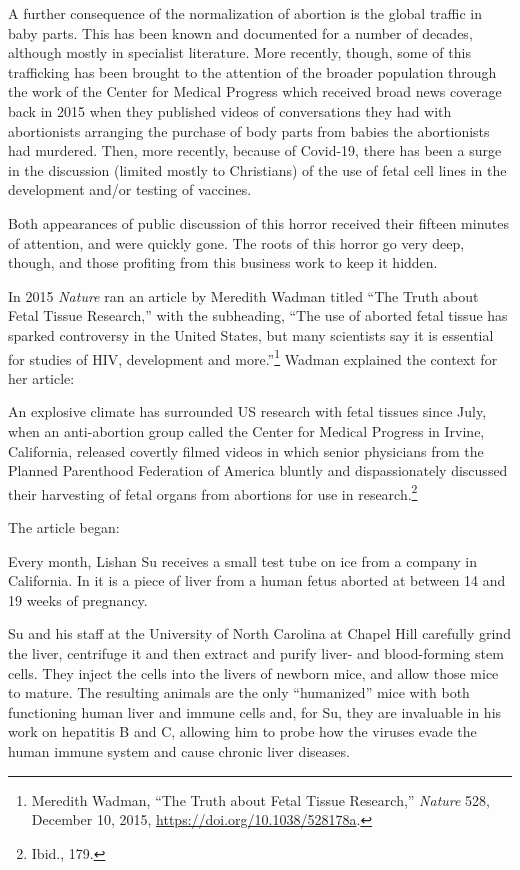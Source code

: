 \documentclass[
]{book}
\begin{document}
A further consequence of the normalization of abortion is the global traffic in baby parts. This has been known and documented for a number of decades, although mostly in specialist literature. More recently, though, some of this trafficking has been brought to the attention of the broader population through the work of the Center for Medical Progress which received broad news coverage back in 2015 when they published videos of conversations they had with abortionists arranging the purchase of body parts from babies the abortionists had murdered. Then, more recently, because of Covid-19, there has been a surge in the discussion (limited mostly to Christians) of the use of fetal cell lines in the development and/or testing of vaccines.

Both appearances of public discussion of this horror received their fifteen minutes of attention, and were quickly gone. The roots of this horror go very deep, though, and those profiting from this business work to keep it hidden.

In 2015 \emph{Nature} ran an article by Meredith Wadman titled ``The Truth about Fetal Tissue Research,'' with the subheading, ``The use of aborted fetal tissue has sparked controversy in the United States, but many scientists say it is essential for studies of HIV, development and more.''\footnote{Meredith Wadman, ``The Truth about Fetal Tissue Research,'' \emph{Nature} 528, December 10, 2015, \url{https://doi.org/10.1038/528178a}.} Wadman explained the context for her article:

An explosive climate has surrounded US research with fetal tissues since July, when an anti-abortion group called the Center for Medical Progress in Irvine, California, released covertly filmed videos in which senior physicians from the Planned Parenthood Federation of America bluntly and dispassionately discussed their harvesting of fetal organs from abortions for use in research.\footnote{Ibid., 179.}

The article began:

Every month, Lishan Su receives a small test tube on ice from a company in California. In it is a piece of liver from a human fetus aborted at between 14 and 19 weeks of pregnancy.

Su and his staff at the University of North Carolina at Chapel Hill carefully grind the liver, centrifuge it and then extract and purify liver- and blood-forming stem cells. They inject the cells into the livers of newborn mice, and allow those mice to mature. The resulting animals are the only ``humanized'' mice with both functioning human liver and immune cells and, for Su, they are invaluable in his work on hepatitis B and C, allowing him to probe how the viruses evade the human immune system and cause chronic liver diseases.
\end{document}
